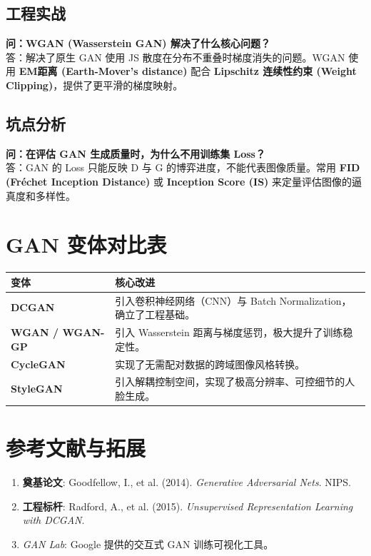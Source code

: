 \documentclass[12pt, a4paper]{book}
\begin{document}
\subsection{工程实战}
\textbf{问：WGAN (Wasserstein GAN) 解决了什么核心问题？}\\
答：解决了原生 GAN 使用 JS 散度在分布不重叠时梯度消失的问题。WGAN 使用 \textbf{EM距离 (Earth-Mover's distance)} 配合 \textbf{Lipschitz 连续性约束 (Weight Clipping)}，提供了更平滑的梯度映射。

\subsection{坑点分析}
\textbf{问：在评估 GAN 生成质量时，为什么不用训练集 Loss？}\\
答：GAN 的 Loss 只能反映 D 与 G 的博弈进度，不能代表图像质量。常用 \textbf{FID (Fréchet Inception Distance)} 或 \textbf{Inception Score (IS)} 来定量评估图像的逼真度和多样性。

\section{GAN 变体对比表}

\begin{table}[h]
\centering
\begin{tabularx}{\textwidth}{|l|X|}
\hline
\textbf{变体} & \textbf{核心改进} \\
\hline
\textbf{DCGAN} & 引入卷积神经网络（CNN）与 Batch Normalization，确立了工程基础。 \\
\hline
\textbf{WGAN / WGAN-GP} & 引入 Wasserstein 距离与梯度惩罚，极大提升了训练稳定性。 \\
\hline
\textbf{CycleGAN} & 实现了无需配对数据的跨域图像风格转换。 \\
\hline
\textbf{StyleGAN} & 引入解耦控制空间，实现了极高分辨率、可控细节的人脸生成。 \\
\hline
\end{tabularx}
\end{table}

\section{参考文献与拓展}
\begin{enumerate}
    \item \textbf{奠基论文}: Goodfellow, I., et al. (2014). \textit{Generative Adversarial Nets}. NIPS.
    \item \textbf{工程标杆}: Radford, A., et al. (2015). \textit{Unsupervised Representation Learning with DCGAN}.
    \item \textit{GAN Lab}: Google 提供的交互式 GAN 训练可视化工具。
\end{enumerate}
\end{document}
